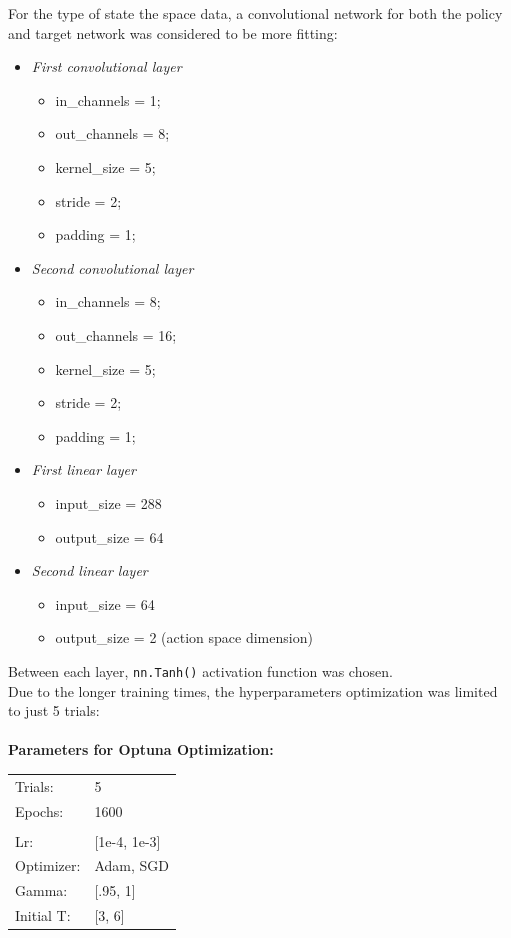 \documentclass[11pt,a4paper,twocolumn]{IEEEtran}
\newcommand{\thinsepline}{\noindent\makebox[\linewidth]{\rule{7.5cm}{0.02pt}}}
\begin{document}
			For the type of state the space data, a convolutional network for both the policy and target network was considered to be more fitting:
			\begin{itemize}
				\item \textit{First convolutional layer}
				\begin{itemize}
					\item in\_channels = 1;
					\item out\_channels = 8;
					\item kernel\_size = 5;
					\item stride = 2;
					\item padding = 1;
				\end{itemize} 
				\item \textit{Second convolutional layer}
				\begin{itemize}
					\item in\_channels = 8;
					\item out\_channels = 16;
					\item kernel\_size = 5;
					\item stride = 2;
					\item padding = 1;
				\end{itemize} 
				\item \textit{First linear layer}
				\begin{itemize}
					\item input\_size = 288
					\item output\_size = 64
				\end{itemize}
				\item \textit{Second linear layer}
				\begin{itemize}
					\item input\_size = 64
					\item output\_size = 2 (action space dimension)
				\end{itemize}
			\end{itemize}
			Between each layer, \texttt{nn.Tanh()} activation function was chosen.\medskip\\
			Due to the longer training times, the hyperparameters optimization was limited to just 5 trials:\\
			\thinsepline\\
			\textbf{Parameters for Optuna Optimization:}\medskip\\
			\begin{tabular}{ll}
				Trials: & 5 \\
				Epochs: & 1600 \\
				\hline\vspace*{-.4cm}\\
				Lr: & [1e-4, 1e-3] \\
				Optimizer: & Adam, SGD\\
				Gamma: & [.95, 1]\\
				Initial T:& [3, 6]\\
			\end{tabular}\\
			\thinsepline\\
\end{document}
